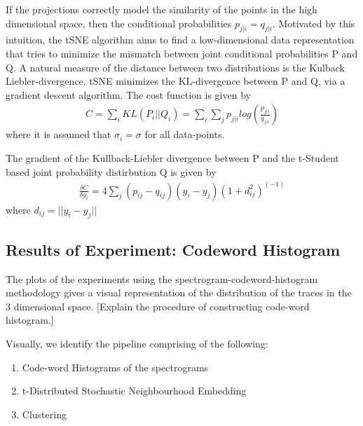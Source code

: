 \documentclass[10pt]{article}
\begin{document}
If the projections correctly model the similarity of the points in the high dimensional space, then the conditional probabilities $p_{j|i} = q_{j|i}$. Motivated by this intuition, the tSNE algorithm aims to find a low-dimensional data representation that tries to minimize the mismatch between joint conditional probabilities P and Q.	A natural measure of the distance between two distributions is the Kulback Liebler-divergence. tSNE minimizes the KL-divergence between P and Q, via a gradient descent algorithm. The cost function is given by
\begin{align}
C = \sum_i KL(P_i || Q_i) = \sum_i \sum_j p_{j|i} log(\frac{p_{j|i}}{q_{j|i}})\label{eq:Cost_tSNE}
\end{align}
where it is assumed that $\sigma_i = \sigma$ for all data-points. 

The gradient of the Kullback-Liebler divergence between P and the t-Student based joint probability distirbution Q is given by
\begin{align}
\frac{\delta C}{\delta y_i} =  4 \sum_j (p_{ij} - q_{ij})(y_i - y_j)(1 + d_{ij}^2)^(-1)\label{eq:Grad_KL_tsne}
\end{align} where $d_{ij} = ||y_i - y_j||$

\subsection{Results of Experiment: Codeword Histogram}

The plots of the experiments using the spectrogram-codeword-histogram methodology gives a visual representation of the distribution of the traces in the 3 dimensional space. 
[Explain the procedure of constructing code-word histogram.]

Visually, we identify the pipeline comprising of the following:
\begin{enumerate}
\item Code-word Histograms of the spectrograms
\item t-Distributed Stochastic Neighbourhood Embedding
\item Clustering 
\end{enumerate} 
\end{document}
